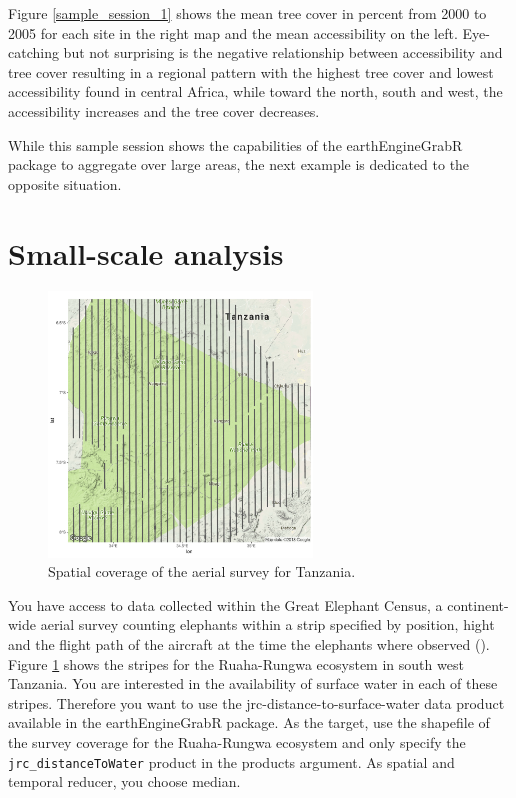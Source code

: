 Figure \ref{sample_session_1} shows the mean tree cover in percent from 2000 to 2005 for each site in the right map and the mean accessibility on the left. Eye-catching but not surprising is the negative relationship between accessibility and tree cover resulting in a regional pattern with the highest tree cover and lowest accessibility found in central Africa, while toward the north, south and west, the accessibility increases and the tree cover decreases.

While this sample session shows the capabilities of the earthEngineGrabR package to aggregate over large areas, the next example is dedicated to the opposite situation. 

\newpage

\section{Small-scale analysis}

\begin{figure}
	\begin{center}
		\vspace{-10mm}
		\includegraphics[width=7cm]{images/stripes-cropped.pdf}
		\caption{Spatial coverage of the aerial survey for Tanzania.}
		\label{stripes}
	\end{center}
\end{figure}

You have access to data collected within the Great Elephant Census, a continent-wide aerial survey counting  elephants within a strip specified by position, hight and the flight path of the aircraft at the time the elephants where observed (\cite{beale2017spatial}). 
Figure \ref{stripes} shows the stripes for the Ruaha-Rungwa ecosystem in south west Tanzania.
You are interested in the availability of surface water in each of these stripes. Therefore you want to use the jrc-distance-to-surface-water data product available in the earthEngineGrabR package. 
As the target, use the shapefile of the survey coverage for the Ruaha-Rungwa ecosystem and only specify the \texttt{jrc\_distanceToWater} product in the products argument. As spatial and temporal reducer, you choose median. 

